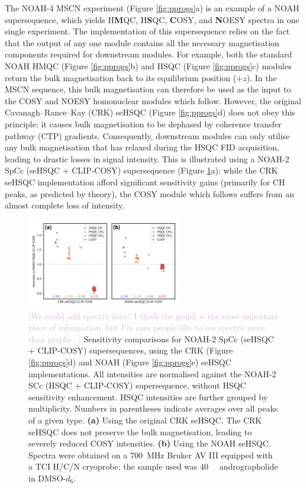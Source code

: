\documentclass[11pt]{article}
\newcommand*{\carbon}{\ce{^{13}C}}
\newcommand*{\nitrogen}{\ce{^{15}N}}
\newcommand*{\hl}[1]{\textcolor{Thistle}{#1}}
\newcommand*{\figref}[1]{Figure \ref{fig:#1}}
\newcommand*{\andro}{Spectra were obtained on a \SI{700}{\MHz} Bruker AV III equipped with a TCI H/C/N cryoprobe; the sample used was \SI{40}{\milli\molar} andrographolide in DMSO-$d_6$.}
\begin{document}
The NOAH-4 MSCN experiment (\figref{pprogs}a) is an example of a NOAH supersequence, which yields \nitrogen{} H\textbf{M}QC, \carbon{} H\textbf{S}QC, \textbf{C}OSY, and \textbf{N}OESY spectra in one single experiment.
The implementation of this supersequence relies on the fact that the output of any one module contains all the necessary magnetisation components required for downstream modules.
For example, both the standard NOAH HMQC (\figref{pprogs}b) and HSQC (\figref{pprogs}c) modules return the bulk magnetisation back to its equilibrium position ($+z$).
In the MSCN sequence, this bulk magnetisation can therefore be used as the input to the COSY and NOESY homonuclear modules which follow.
However, the original Cavanagh--Rance--Kay (CRK) seHSQC (\figref{pprogs}d) does not obey this principle: it causes bulk magnetisation to be dephased by coherence transfer pathway (CTP) gradients.
Consequently, downstream modules can only utilise any bulk magnetisation that has relaxed during the HSQC FID acquisition, leading to drastic losses in signal intensity.
This is illustrated using a NOAH-2 SpCc (seHSQC + CLIP-COSY\autocite{Koos2016ACIE}) supersequence (\figref{spor_spv2}a): while the CRK seHSQC implementation afford significant sensitivity gains (primarily for CH peaks, as predicted by theory\autocite{sehsqc_sens}), the COSY module which follows suffers from an almost complete loss of intensity.

\begin{figure}
    \centering
    \includegraphics[width=0.6\textwidth]{spor_spv2_comp.png}
    \caption{
        \hl{[We could add spectra here? I think the graph is the most important piece of information, but I'm sure people like to see spectra more than graphs...]}
        Sensitivity comparisons for NOAH-2 SpCc (seHSQC + CLIP-COSY) supersequences, using the CRK (\figref{pprogs}d) and NOAH (\figref{pprogs}e) seHSQC implementations.
        All intensities are normalised against the NOAH-2 SCc (HSQC + CLIP-COSY) supersequence, without HSQC sensitivity enhancement.
        HSQC intensities are further grouped by multiplicity.
        Numbers in parentheses indicate averages over all peaks of a given type.
        \textbf{(a)} Using the original CRK seHSQC.
        The CRK seHSQC does not preserve the bulk magnetisation, leading to severely reduced COSY intensities.
        \textbf{(b)} Using the NOAH seHSQC.
        \andro{}
    }
    \label{fig:spor_spv2}
\end{figure}
\end{document}
